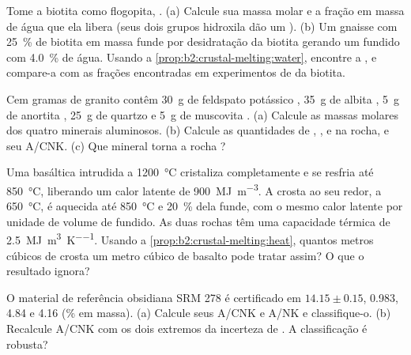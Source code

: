 \begin{exercise}[$\star\star$]\label{exo:b2:crustal-melting:5}
Tome a biotita como flogopita, . (a) Calcule sua massa molar e a
fração em massa de água que ela libera (seus dois grupos hidroxila dão um ).
(b) Um gnaisse com \qty{25}{\percent} de biotita em massa funde por desidratação da biotita
gerando um fundido com \qty{4.0}{\percent} de água. Usando a
\cref{prop:b2:crustal-melting:water}, encontre a , e compare-a com as
frações encontradas em experimentos de  da biotita.
\end{exercise}

\begin{exercise}[$\star\star$]\label{exo:b2:crustal-melting:6}
Cem gramas de granito contêm \qty{30}{\gram} de feldspato potássico ,
\qty{35}{\gram} de albita , \qty{5}{\gram} de anortita ,
\qty{25}{\gram} de quartzo e \qty{5}{\gram} de muscovita .
(a) Calcule as massas molares dos quatro minerais aluminosos. (b) Calcule as quantidades de
, ,  e  na rocha, e seu A/CNK. (c) Que
mineral torna a rocha ?
\end{exercise}

\begin{exercise}[$\star\star$]\label{exo:b2:crustal-melting:7}
Uma  basáltica intrudida a \qty{1200}{\celsius} cristaliza completamente e se resfria até
\qty{850}{\celsius}, liberando um calor latente de \qty{900}{\mega\joule\per\cubic\metre}.
A crosta ao seu redor, a \qty{650}{\celsius}, é aquecida até \qty{850}{\celsius} e
\qty{20}{\percent} dela funde, com o mesmo calor latente por unidade de volume de fundido. As duas
rochas têm uma capacidade térmica de \qty{2.5}{\mega\joule\per\cubic\metre\per\kelvin}. Usando a
\cref{prop:b2:crustal-melting:heat}, quantos metros cúbicos de crosta um metro cúbico
de basalto pode tratar assim? O que o resultado ignora?
\end{exercise}

\begin{exercise}[$\star\star$]\label{exo:b2:crustal-melting:8}
O material de referência obsidiana SRM 278 é certificado em 
$14.15 \pm 0.15$,  0.983,  4.84 e  4.16 (\unit{\percent} em
massa). (a) Calcule seus A/CNK e A/NK e classifique-o. (b) Recalcule A/CNK com os dois
extremos da incerteza de . A classificação é robusta?
\end{exercise}

